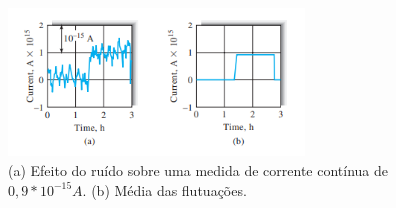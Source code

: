 




\begin{figure}[ht]
    \centering
    \caption{(a) Efeito do ruído sobre uma medida de corrente contínua de $ 0,9*10^{-15}A$. (b) Média das flutuações.}
    \begin{center}
        \includegraphics[width=0.7\textwidth]{img/print_relacao_Sinal-Ruido.png}
    \end{center}
    \vspace{-0.5cm}
    

    
    \label{fig:RelacaoSinalRuido}
\end{figure}